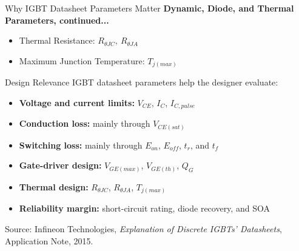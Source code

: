 \begin{frame}{Why IGBT Datasheet Parameters Matter}
\textbf{Dynamic, Diode, and Thermal Parameters, continued...}
\begin{itemize}
    \item Thermal Resistance: $R_{\theta JC},\ R_{\theta JA}$
    \item Maximum Junction Temperature: $T_{j(max)}$
\end{itemize}

\begin{block}{Design Relevance}
IGBT datasheet parameters help the designer evaluate:
\begin{itemize}
    \item \textbf{Voltage and current limits:} $V_{CE}$, $I_C$, $I_{C,pulse}$
    \item \textbf{Conduction loss:} mainly through $V_{CE(sat)}$
    \item \textbf{Switching loss:} mainly through $E_{on}$, $E_{off}$, $t_r$, and $t_f$
    \item \textbf{Gate-driver design:} $V_{GE(max)}$, $V_{GE(th)}$, $Q_G$
    \item \textbf{Thermal design:} $R_{\theta JC}$, $R_{\theta JA}$, $T_{j(max)}$
    \item \textbf{Reliability margin:} short-circuit rating, diode recovery, and SOA
\end{itemize}
\end{block}

\vspace{0.15cm}

\small
Source: Infineon Technologies, \textit{Explanation of Discrete IGBTs' Datasheets}, Application Note, 2015.
\end{frame}